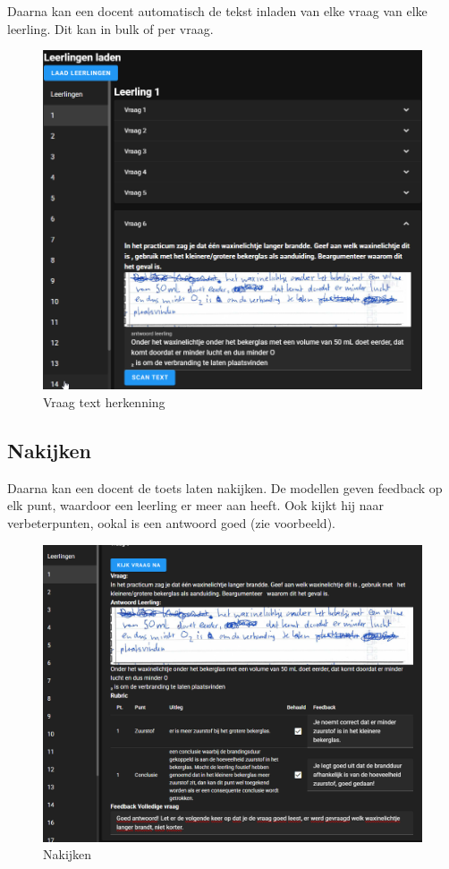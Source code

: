 \documentclass[12pt]{article}
\begin{document}
Daarna kan een docent automatisch de tekst inladen van elke vraag van elke leerling. Dit kan in bulk of per vraag.
\begin{figure}[H]
    \centering
    \includegraphics[width=\linewidth]{./images/demo/scanning/text.png}
    \caption{Vraag text herkenning}
    \label{fig:scan-text}
\end{figure}

\pagebreak
\subsection{Nakijken}
Daarna kan een docent de toets laten nakijken. De modellen geven feedback op elk punt, waardoor een leerling er meer aan heeft. Ook kijkt hij naar verbeterpunten, ookal is een antwoord goed (zie voorbeeld).
\begin{figure}[H]
    \centering
    \includegraphics[width=\linewidth]{./images/demo/grading/grade.png}
    \caption{Nakijken}
    \label{fig:grade-result}
\end{figure}
\pagebreak
\end{document}
